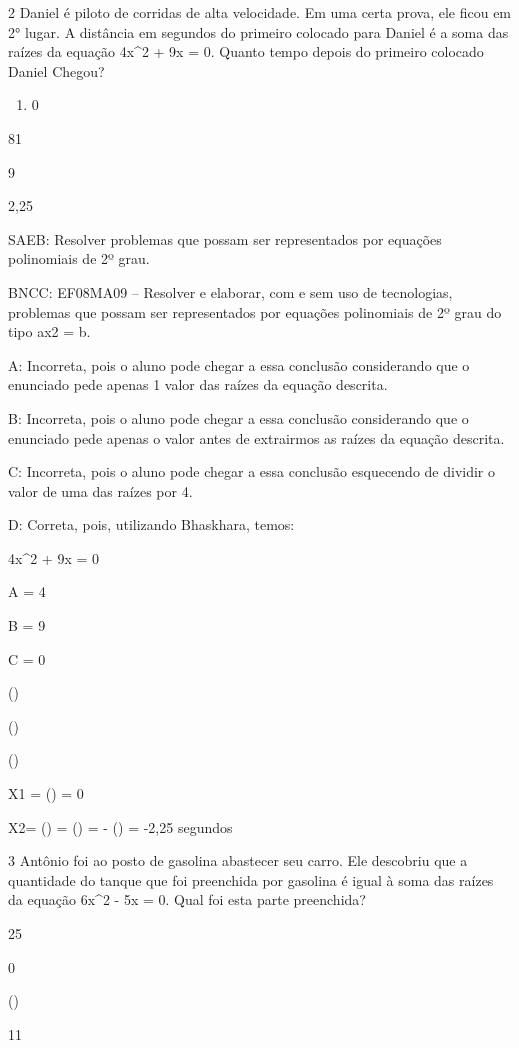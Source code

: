 {\num{2} Daniel é piloto de corridas de alta velocidade. Em uma certa prova,
ele ficou em 2° lugar. A distância em segundos do primeiro colocado para
Daniel é a soma das raízes da equação 4x^2 + 9x = 0. Quanto tempo depois
do primeiro colocado Daniel Chegou?

\begin{enumerate}
\def\labelenumi{\alph{enumi})}
\tightlist
\item
  0
\end{enumerate}
\item 81
\item 9
\item 2,25

SAEB: Resolver problemas que possam ser representados por equações
polinomiais de 2º grau.

BNCC: EF08MA09 -- Resolver e elaborar, com e sem uso de tecnologias,
problemas que possam ser representados por equações polinomiais de 2º
grau do tipo ax2 = b.

A: Incorreta, pois o aluno pode chegar a essa conclusão considerando que
o enunciado pede apenas 1 valor das raízes da equação descrita.

B: Incorreta, pois o aluno pode chegar a essa conclusão considerando que
o enunciado pede apenas o valor antes de extrairmos as raízes da equação
descrita.

C: Incorreta, pois o aluno pode chegar a essa conclusão esquecendo de
dividir o valor de uma das raízes por 4.

D: Correta, pois, utilizando Bhaskhara, temos:

4x^2 + 9x = 0

A = 4

B = 9

C = 0

()

()

()

X1 = () = 0

X2= () = () = - () =
-2,25 segundos

\num{3} Antônio foi ao posto de gasolina abastecer seu carro. Ele descobriu
que a quantidade do tanque que foi preenchida por gasolina é igual à
soma das raízes da equação 6x^2 - 5x = 0. Qual foi esta parte preenchida?
\item 25
\item 0
\item ()
\item 11

}
